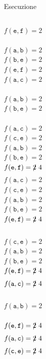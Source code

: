 \begin{frame}{Esecuzione}
\begin{columns}[T]
\begin{overprint}
$f(\mathtt{e},\mathtt{f}) = 2$\\
\\
$f(\mathtt{a},\mathtt{b}) = 2$\\
$f(\mathtt{b},\mathtt{e}) = 2$\\
$f(\mathtt{e},\mathtt{f}) = 2$\\
$f(\mathtt{a},\mathtt{c}) = 2$\\
\\
$f(\mathtt{a},\mathtt{b}) = 2$\\
$f(\mathtt{b},\mathtt{e}) = 2$\\
\\
$f(\mathtt{a},\mathtt{c}) = 2$\\
$f(\mathtt{c},\mathtt{e}) = 2$\\
$f(\mathtt{a},\mathtt{b}) = 2$\\
$f(\mathtt{b},\mathtt{e}) = 2$\\
$f(\mathtt{e},\mathtt{f}) = \xout{2} \ 4$\\
$f(\mathtt{a},\mathtt{c}) = 2$\\
$f(\mathtt{c},\mathtt{e}) = 2$\\
$f(\mathtt{a},\mathtt{b}) = 2$\\
$f(\mathtt{b},\mathtt{e}) = 2$\\
$f(\mathtt{e},\mathtt{f}) = \xout{2} \ 4$\\
\\
$f(\mathtt{c},\mathtt{e}) = 2$\\
$f(\mathtt{a},\mathtt{b}) = 2$\\
$f(\mathtt{b},\mathtt{e}) = 2$\\
$f(\mathtt{e},\mathtt{f}) = \xout{2} \ 4$\\
$f(\mathtt{a},\mathtt{c}) = \xout{2} \ 4$\\
\\
$f(\mathtt{a},\mathtt{b}) = 2$\\
\\
$f(\mathtt{e},\mathtt{f}) = \xout{2} \ 4$\\
$f(\mathtt{a},\mathtt{c}) = \xout{2} \ 4$\\
$f(\mathtt{c},\mathtt{e}) = \xout{2} \ 4$\\

\end{overprint}
\end{columns}
\end{frame}
